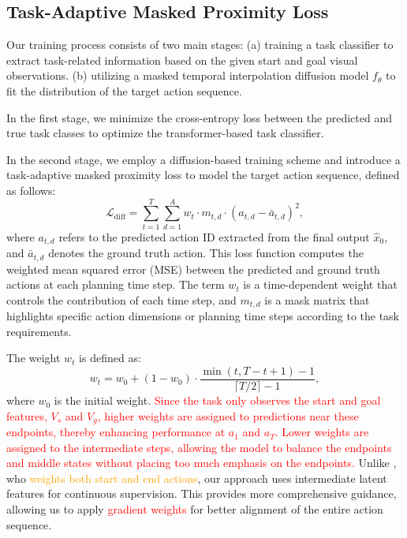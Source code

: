 \subsection{Task-Adaptive Masked Proximity Loss}
\label{method3}


Our training process consists of two main stages: 
(a) training a task classifier to extract task-related information based on the given start and goal visual observations.
(b) utilizing a masked temporal interpolation diffusion model $f_\theta$ to fit the distribution of the target action sequence.


In the first stage, we minimize the cross-entropy loss between the predicted and true task classes to optimize the transformer-based task classifier.

In the second stage, we employ a diffusion-based training scheme and introduce a task-adaptive masked proximity loss to model the target action sequence, defined as follows:
\begin{equation}
    \mathcal{L}_{\mathrm{diff}} = \sum_{t=1}^{T} \sum_{d=1}^{A} w_t \cdot m_{t,d} \cdot (a_{t,d} - \bar{a}_{t,d})^2,
\end{equation}
where $a_{t,d}$ refers to the predicted action ID extracted from the final output $\hat{x}_0$, and $\bar{a}_{t,d}$ denotes the ground truth action. This loss function computes the weighted mean squared error (MSE) between the predicted and ground truth actions at each planning time step. The term $w_t$ is a time-dependent weight that controls the contribution of each time step, and $m_{t,d}$ is a mask matrix that highlights specific action dimensions or planning time steps according to the task requirements.

The weight \( w_t \) is defined as:
\begin{equation}
w_t = w_0 + (1 - w_0) \cdot \frac{\min(t, T - t + 1) - 1}{\lceil T/2 \rceil - 1},
\end{equation}
where \( w_0 \) is the initial weight. \textcolor{red}{Since the task only observes the start and goal features, $V_s$ and $V_g$, higher weights are assigned to predictions near these endpoints, thereby enhancing performance at $a_1$ and $a_T$. Lower weights are assigned to the intermediate steps, allowing the model to balance the endpoints and middle states without placing too much emphasis on the endpoints.} Unlike \citet{wang2023pdpp}, who \textcolor{orange}{weights both start and end actions}, our approach uses intermediate latent features for continuous supervision. This provides more comprehensive guidance, allowing us to apply \textcolor{red}{gradient weights} for better alignment of the entire action sequence. 

